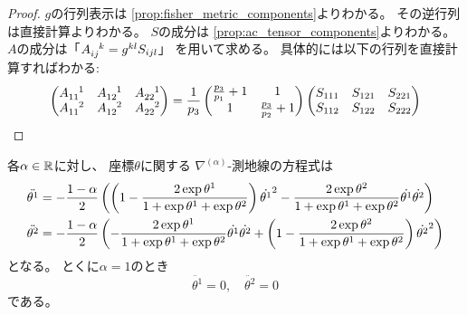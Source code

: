 \documentclass[report]{jlreq}
\begin{document}
\begin{proof}
    $g$の行列表示は
    \cref{prop:fisher_metric_components}よりわかる。
    その逆行列は直接計算よりわかる。
    $S$の成分は
    \cref{prop:ac_tensor_components}よりわかる。
    $A$の成分は「$A_{ij}^{\hphantom{ij}k} = g^{kl} S_{ijl}$」
    を用いて求める。
    具体的には以下の行列を直接計算すればわかる:
    \begin{equation}
        \begin{pmatrix}
            A_{11}^{\hphantom{11}1}
                & A_{12}^{\hphantom{12}1}
                & A_{22}^{\hphantom{22}1}
                \\
            A_{11}^{\hphantom{11}2}
                & A_{12}^{\hphantom{12}2}
                & A_{22}^{\hphantom{22}2}
        \end{pmatrix}
            =
                \frac{1}{p_3}
                \begin{pmatrix}
                    \frac{p_3}{p_1} + 1 & 1 \\
                    1 & \frac{p_3}{p_2} + 1
                \end{pmatrix}
                \begin{pmatrix}
                    S_{111}
                        & S_{121}
                        & S_{221}
                        \\
                    S_{112}
                        & S_{122}
                        & S_{222}
                \end{pmatrix}
    \end{equation}
\end{proof}

\begin{proposition}[$n = 3$での測地線方程式]
    各$\alpha \in \mathbb{R}$に対し、
    座標$\theta$に関する
    $\nabla^{(\alpha)}$-測地線の方程式は
    \begin{alignat}{1}
        \ddot{\theta^1}
            &=
                - \frac{1 - \alpha}{2}
                \left({
                    \left({
                        1 - \frac{2 \exp \theta^1}{1 + \exp \theta^1 + \exp \theta^2}
                    }\right)
                    \dot{\theta^1}^2
                    -
                    \frac{2 \exp \theta^2}{1 + \exp \theta^1 + \exp \theta^2}
                    \dot{\theta^1} \dot{\theta^2}
                }\right)
                \\
        \ddot{\theta^2}
            &=
                - \frac{1 - \alpha}{2}
                \left({
                    -
                    \frac{2 \exp \theta^1}{1 + \exp \theta^1 + \exp \theta^2}
                    \dot{\theta^1} \dot{\theta^2}
                    + \left({
                        1 - \frac{2 \exp \theta^2}{1 + \exp \theta^1 + \exp \theta^2}
                    }\right)
                    \dot{\theta^2}^2
                }\right)
    \end{alignat}
    となる。
    とくに$\alpha = 1$のとき
    \begin{equation}
        \ddot{\theta^1} = 0,
            \quad
            \ddot{\theta^2} = 0
    \end{equation}
    である。
\end{proposition}
\end{document}
